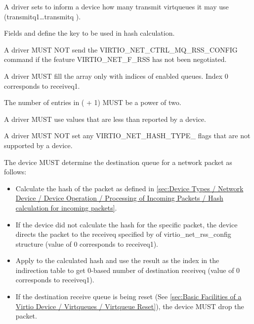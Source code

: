 A driver sets  to inform a device how many transmit virtqueues it may use (transmitq1\ldots transmitq ).

Fields  and  define the key to be used in hash calculation.


A driver MUST NOT send the VIRTIO_NET_CTRL_MQ_RSS_CONFIG command if the feature VIRTIO_NET_F_RSS has not been negotiated.

A driver MUST fill the  array only with indices of enabled queues. Index 0 corresponds to receiveq1.

The number of entries in  ( + 1) MUST be a power of two.

A driver MUST use  values that are less than  reported by a device.

A driver MUST NOT set any VIRTIO_NET_HASH_TYPE_ flags that are not supported by a device.

The device MUST determine the destination queue for a network packet as follows:
\begin{itemize}
\item Calculate the hash of the packet as defined in \ref{sec:Device Types / Network Device / Device Operation / Processing of Incoming Packets / Hash calculation for incoming packets}.
\item If the device did not calculate the hash for the specific packet, the device directs the packet to the receiveq specified by  of virtio_net_rss_config structure (value of 0 corresponds to receiveq1).
\item Apply  to the calculated hash and use the result as the index in the indirection table to get 0-based number of destination receiveq (value of 0 corresponds to receiveq1).
\item If the destination receive queue is being reset (See \ref{sec:Basic Facilities of a Virtio Device / Virtqueues / Virtqueue Reset}), the device MUST drop the packet.
\end{itemize}

